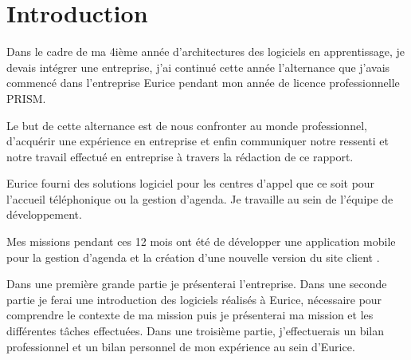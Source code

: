 \chapter{Introduction}

Dans le cadre de ma 4ième année d'architectures des logiciels en apprentissage, 
je devais intégrer une entreprise, j'ai continué cette année l'alternance que j'avais commencé 
dans l'entreprise Eurice pendant mon année de licence professionnelle PRISM.\newline

Le but de cette alternance est de nous confronter au monde professionnel, 
d’acquérir une expérience en entreprise et enfin communiquer notre ressenti et 
notre travail effectué en entreprise à travers la rédaction de ce rapport. \newline

Eurice fourni des solutions logiciel pour les centres d'appel 
que ce soit pour l'accueil téléphonique ou la gestion d'agenda. 
Je travaille au sein de l’équipe de développement. 

Mes missions pendant ces 12 mois ont été de développer une application mobile pour la gestion d'agenda et
la création d'une nouvelle version du site client . \newline

Dans une première grande partie je présenterai l’entreprise. 
Dans une seconde partie je ferai une introduction des logiciels réalisés à Eurice, 
nécessaire pour comprendre le contexte de ma mission 
puis je présenterai ma mission et les différentes tâches effectuées.
Dans une troisième partie, j'effectuerais un bilan professionnel et un bilan personnel de mon expérience 
au sein d'Eurice. \newline


